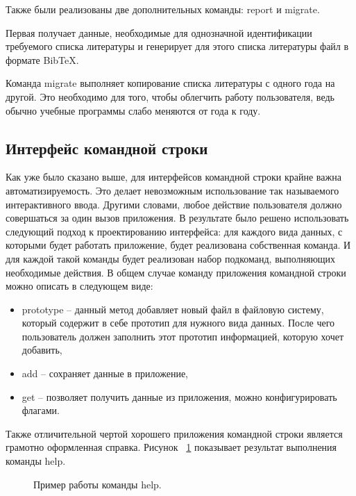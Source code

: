 Также были реализованы две дополнительных команды: report и migrate.

Первая получает данные, необходимые для однозначной идентификации требуемого списка литературы
и генерирует для этого списка литературы файл в формате BibTeX. 

Команда migrate выполняет копирование списка литературы с одного года на другой. Это необходимо для того,
чтобы облегчить работу пользователя, ведь обычно учебные программы слабо меняются от года к году.

\subsection*{Интерфейс командной строки}

Как уже было сказано выше, для интерфейсов командной строки крайне важна автоматизируемость.
Это делает невозможным использование так называемого интерактивного ввода. Другими словами,
любое действие пользователя должно совершаться за один вызов приложения. В результате
было решено использовать следующий подход к проектированию интерфейса: для каждого вида данных,
с которыми будет работать приложение, будет реализована собственная команда. И для каждой такой
команды будет реализован набор подкоманд, выполняющих необходимые действия. В общем случае
команду приложения командной строки можно описать в следующем виде:

\begin{itemize}
    \item prototype -- данный метод добавляет новый файл в файловую систему,
        который содержит в себе прототип для нужного вида данных. После чего пользователь
        должен заполнить этот прототип информацией, которую хочет добавить,
    \item add -- сохраняет данные в приложение,
    \item get -- позволяет получить данные из приложения, можно конфигурировать
        флагами.
\end{itemize}

Также отличительной чертой хорошего приложения командной строки является грамотно оформленная справка.
Рисунок ~\ref{ris:help_example} показывает результат выполнения команды help. 

\begin{figure}[h!]
    \caption{Пример работы команды help.}
    \label{ris:help_example}
\end{figure}


